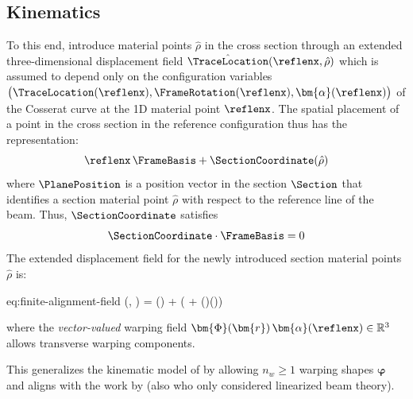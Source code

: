 \subsection{Kinematics}
To this end, introduce material points $\hat{{\rho}}$ in the cross section through an extended three-dimensional displacement field $\hat{\TraceLocation}(\reflenx, \hat{{\rho}})$ which is assumed to depend only on the configuration variables \(\bigl(\TraceLocation(\reflenx), \FrameRotation (\reflenx), \bm{\alpha}(\reflenx)\bigr)\)  of the Cosserat curve at the 1D material point \(\reflenx\). 
The spatial placement of a point in the cross section in the reference configuration thus has the representation:
\begin{equation*}
    \reflenx\,\FrameBasis + \SectionCoordinate(\hat{\rho})
\end{equation*}
where $\PlanePosition$ %
is a position vector in the section \(\Section\) that identifies a section material point $\hat{\rho}$ with respect to the reference line of the beam. 
Thus, \(\SectionCoordinate\) satisfies
\begin{equation*}
\SectionCoordinate \cdot \FrameBasis = 0
\end{equation*}
%
The extended displacement field for the newly introduced section material points $\hat{\rho}$  is:
\begin{SaveEquation}{eq:finite-alignment-field}
(, \PlanePosition) 
= () + \FrameRotation \bigl(\PlanePosition 
+ \WarpTotalShapes(\PlanePosition)\bm{\alpha}()\bigr)
\end{SaveEquation}
%
where the \emph{vector-valued} warping field
\(\bm{\Phi}(\bm{r})\,\bm{\alpha}(\reflenx)\in\mathbb{R}^3\) allows transverse warping components.
%
\begin{remark}
This generalizes the kinematic model of \cite{simo1991geometricallyexact} by allowing \(n_w \ge 1\) warping shapes \(\bm{\varphi}\) and aligns with the work by \cite{klinkel2003anisotropic} (also \cite{elfatmi2007nonuniform} who only considered linearized beam theory).
\end{remark}
